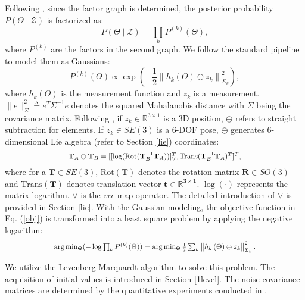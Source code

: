Following \cite{isam2,gtsam}, since the factor graph is determined, the posterior probability $P(\Theta \mid \mathcal{Z})$ is factorized as:
\begin{equation}
P(\Theta \mid \mathcal{Z})=\prod_k P^{(k)}(\Theta),
\label{obj}
\end{equation}
where $P^{(k)}$ are the factors in the second graph. We follow the standard pipeline \cite{isam2} to model them as Gaussians:
\begin{equation}
 P^{(k)}(\Theta) \propto \exp \left(-\frac{1}{2}\left\|h_k\left(\Theta\right)\ominus z_k\right\|_{\Sigma_k}^2\right),
\end{equation}
where $h_k\left(\Theta \right)$ is the measurement function and $z_k$ is a measurement.
%
$\|e\|_{\Sigma}^2 \triangleq e^T \Sigma^{-1} e$ denotes the squared Mahalanobis distance with $\Sigma$ being the covariance matrix. 
%
Following \cite{tagslam}, if $z_k\in\mathbb{R}^{3\times1}$ is a 3D position, $\ominus$ refers to straight subtraction for elements. 
%
If $z_k\in SE(3)$ is a 6-DOF pose, $\ominus$ generates 6-dimensional Lie algebra (refer to Section \ref{lie}) coordinates:
\begin{equation}{\resizebox{0.6\hsize}{!}{$\mathbf{T}_{A} \ominus \mathbf{T}_{B} = [[\log(\mathrm{Rot}(\mathbf{T}_{B}^{-1}\mathbf{T}_{A}))]^{T}_{\vee}, \mathrm{Trans}(\mathbf{T}_{B}^{-1}\mathbf{T}_{A})^{T} ]^{T},
$} } \end{equation} 
where for a $\mathbf{T} \in SE(3)$, $\mathrm{Rot}(\mathbf{T})$ denotes the rotation matrix $\mathbf{R} \in SO(3)$ and $\mathrm{Trans}(\mathbf{T})$ denotes translation vector $\mathbf{t \in \mathbb{R}^{3\times1}}$. 
%
$\log(\cdot)$ represents the matrix logarithm. $\vee$ is the \textit{vee} map operator. The detailed introduction of $\vee$ is provided in Section \ref{lie}.  With the Gaussian modeling, the objective function in Eq. (\ref{obj}) is transformed into a least square problem by applying the negative logarithm:
\begin{equation}
\resizebox{0.7\hsize}{!}{$\arg \min _{\Theta}(-\log \prod_k P^{(k)}(\Theta))= 
\arg \min _{\Theta} \frac{1}{2} \sum_k\left\|h_k\left(\Theta\right)\ominus z_k\right\|_{\Sigma_k}^2.$}
\end{equation} \par

We utilize the Levenberg-Marquardt algorithm \cite{gtsam} to solve this problem. The acquisition of initial values is introduced in Section \ref{1level}. The noise covariance matrices are determined by the quantitative experiments conducted in \cite{iilfm}.
